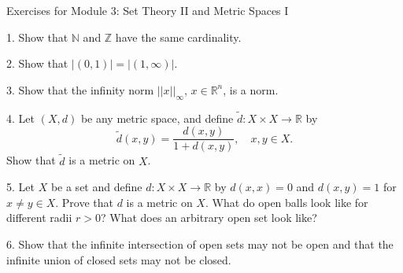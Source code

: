 \documentclass{article}
\theoremstyle{remark} %
\newcommand{\R}{{\mathbb{R}}}
\newcommand{\Z}{{\mathbb{Z}}}
\newcommand{\N}{{\mathbb{N}}}
\begin{document}
\begin{center}
\Large{Exercises for Module 3: Set Theory II and Metric Spaces I}
\end{center}


1. Show that $\N$ and $\Z$ have the same cardinality. 

\vspace{11cm} %




2. Show that $|(0,1)| =|(1,\infty)|$.

\vspace{11cm} %





3. Show that the infinity norm $||x||_\infty$, $x \in \R^n$, is a norm.

    
\vspace{9cm} %




4. Let $(X,d)$ be any metric space, and define $\tilde d: X \times X \to \R$ by 
    \begin{equation*}
        \tilde d(x,y) = \frac{d(x,y)}{1+d(x,y)}, \quad x,y \in X .
    \end{equation*}
    Show that $\tilde d$ is a metric on $X$.

\vspace{13cm} %



5. Let $X$ be a set and define $d\colon X \times X \to \R$ by $d(x,x) = 0$ and $d(x,y)=1$ for $x\neq y \in X$. Prove that $d$ is a metric on $X$. What do open balls look like for different radii $r>0$? What does an arbitrary open set look like?

\vspace{13cm} %




6. Show that the infinite intersection of open sets may not be open and that the infinite union of closed sets may not be closed.
\vspace{11cm} %

\end{document}
